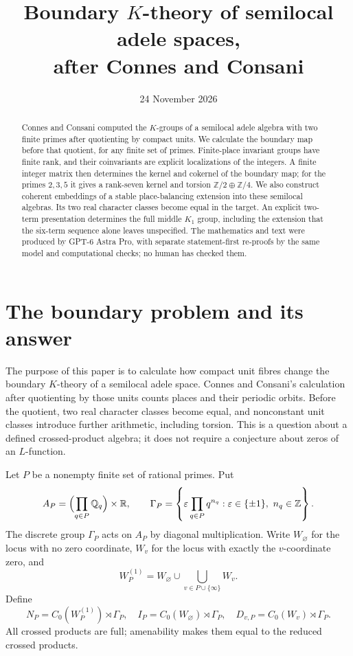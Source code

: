 \documentclass[11pt]{article}
\title{Boundary $K$-theory of semilocal adele spaces,\\
after Connes and Consani}
\author{}
\date{24 November 2026}
\newcommand{\Z}{\mathbb Z}
\newcommand{\Q}{\mathbb Q}
\newcommand{\R}{\mathbb R}
\theoremstyle{definition}
\theoremstyle{remark}
\begin{document}
\maketitle
\begin{abstract}
Connes and Consani computed the $K$-groups of a semilocal adele algebra with two finite primes after quotienting by compact units. We calculate the boundary map before that quotient, for any finite set of primes. Finite-place invariant groups have finite rank, and their coinvariants are explicit localizations of the integers. A finite integer matrix then determines the kernel and cokernel of the boundary map; for the primes $2,3,5$ it gives a rank-seven kernel and torsion $\Z/2\oplus\Z/4$. We also construct coherent embeddings of a stable place-balancing extension into these semilocal algebras. Its two real character classes become equal in the target. An explicit two-term presentation determines the full middle $K_1$ group, including the extension that the six-term sequence alone leaves unspecified. The mathematics and text were produced by GPT-6 Astra Pro, with separate statement-first re-proofs by the same model and computational checks; no human has checked them.
\end{abstract}

\section{The boundary problem and its answer}

The purpose of this paper is to calculate how compact unit fibres change the boundary $K$-theory of a semilocal adele space. Connes and Consani's calculation after quotienting by those units counts places and their periodic orbits. Before the quotient, two real character classes become equal, and nonconstant unit classes introduce further arithmetic, including torsion. This is a question about a defined crossed-product algebra; it does not require a conjecture about zeros of an $L$-function.

Let $P$ be a nonempty finite set of rational primes. Put
\[
 A_P=\Bigl(\prod_{q\in P}\Q_q\Bigr)\times\R,
 \qquad
 \Gamma_P=\left\{\varepsilon\prod_{q\in P}q^{n_q}:
 \varepsilon\in\{\pm1\},\ n_q\in\Z\right\}.
\]
The discrete group $\Gamma_P$ acts on $A_P$ by diagonal multiplication. Write $W_\varnothing$ for the locus with no zero coordinate, $W_v$ for the locus with exactly the $v$-coordinate zero, and
\[
 W_P^{(1)}=W_\varnothing\cup\bigcup_{v\in P\cup\{\infty\}}W_v.
\]
Define
\[
 N_P=C_0(W_P^{(1)})\rtimes\Gamma_P,\quad
 I_P=C_0(W_\varnothing)\rtimes\Gamma_P,\quad
 D_{v,P}=C_0(W_v)\rtimes\Gamma_P.
\]
All crossed products are full; amenability makes them equal to the reduced crossed products.
\end{document}
